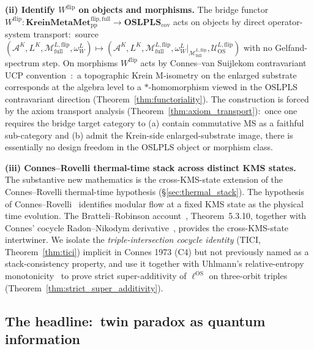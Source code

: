 \documentclass[11pt,a4paper]{article}
\theoremstyle{plain}
\theoremstyle{definition}
\newcommand{\Acal}{\mathcal{A}}
\newcommand{\Mcal}{\mathcal{M}}
\newcommand{\Ucal}{\mathcal{U}}
\newcommand{\BWvac}{\omega_{W}^{L}}
\newcommand{\OSLPLS}{\mathbf{OSLPLS}_{\mathrm{cov}}}
\newcommand{\KreinMMflip}{\mathbf{KreinMetaMet}_{\mathrm{pp}}^{\mathrm{flip},\mathrm{full}}}
\newcommand{\ellOS}{\ell^{\mathrm{OS}}}
\newcommand{\Mflipfull}{\Mcal^{L,\mathrm{flip}}_{\mathrm{full}}}
\newcommand{\Wflip}{W^{\mathrm{flip}}}
\begin{document}
\textbf{(ii) Identify $\Wflip$ on objects and morphisms.} The bridge
functor $\Wflip:\KreinMMflip\to\OSLPLS$ acts on objects by direct
operator-system transport:\ source $(\Acal^{K},L^{K},\Mflipfull,
\BWvac)\mapsto(\Acal^{K},L^{K},\Mflipfull,
\BWvac|_{\Mflipfull},\Ucal^{L,\mathrm{flip}}_{\mathrm{OS}})$ with no
Gelfand-spectrum step. On morphisms $\Wflip$ acts by Connes--van
Suijlekom contravariant UCP convention~\cite{connes_vs2021}:\
a topographic Krein M-isometry on the enlarged substrate corresponds
at the algebra level to a $*$-homomorphism viewed in the OSLPLS
contravariant direction (Theorem~\ref{thm:functoriality}). The
construction is forced by the axiom transport analysis
(Theorem~\ref{thm:axiom_transport}):\ once one requires the bridge
target category to (a) contain commutative MS as a faithful
sub-category and (b) admit the Krein-side enlarged-substrate image,
there is essentially no design freedom in the OSLPLS object or
morphism class.

\textbf{(iii) Connes--Rovelli thermal-time stack across distinct KMS
states.} The substantive new mathematics is the cross-KMS-state
extension of the Connes--Rovelli thermal-time hypothesis
(\S\ref{sec:thermal_stack}). The hypothesis of
Connes--Rovelli~\cite{connes_rovelli1994} identifies modular flow at a
fixed KMS state as the physical time evolution. The Bratteli--Robinson
account~\cite{bratteli_robinson1981}, Theorem~5.3.10, together with
Connes' cocycle Radon--Nikodym derivative~\cite{connes1973}, provides
the cross-KMS-state intertwiner. We isolate the
\emph{triple-intersection cocycle identity} (TICI,
Theorem~\ref{thm:tici}) implicit in Connes 1973 (C4) but not
previously named as a stack-consistency property, and use it together
with Uhlmann's relative-entropy
monotonicity~\cite{uhlmann1977,lindblad1975} to prove strict
super-additivity of $\ellOS$ on three-orbit triples
(Theorem~\ref{thm:strict_super_additivity}).

\subsection{The headline:\ twin paradox as quantum information}
\label{sec:headline_twin_paradox}
\end{document}
